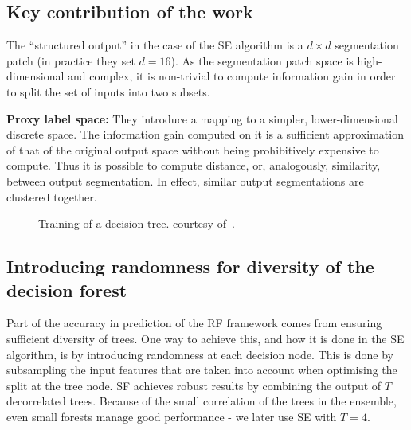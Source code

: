\subsection*{Key contribution of the work}
The ``structured output'' in the case of the SE algorithm is a $d\times d$ segmentation patch (in practice they set $d = 16$). 
As the segmentation patch space is high-dimensional and complex, it is non-trivial to compute information gain in order to split the set of inputs into two subsets.

\textbf{Proxy label space:} They introduce a mapping to a simpler, lower-dimensional discrete space. The information gain computed on it is a sufficient approximation of that of the original output space without being prohibitively expensive to compute. Thus it is possible to compute distance, or, analogously, similarity, between output segmentation. In effect, similar output segmentations are clustered together.

\begin{figure}[ht!]
\centering
\caption{Training of a decision tree. \protect{} courtesy of~\cite{DollarICCV13PresentationSlides}.}
\label{fig:srf-training}
\end{figure}

\subsection*{Introducing randomness for diversity of the decision forest}
Part of the accuracy in prediction of the RF framework comes from ensuring sufficient diversity of trees. One way to achieve this, and how it is done in the SE algorithm, is by introducing randomness at each decision node. This is done by subsampling the input features that are taken into account when optimising the split at the tree node. SF achieves robust results by combining the output of $T$ decorrelated trees. Because of the small correlation of the trees in the ensemble, even small forests manage good performance - we later use SE with $T=4$.

